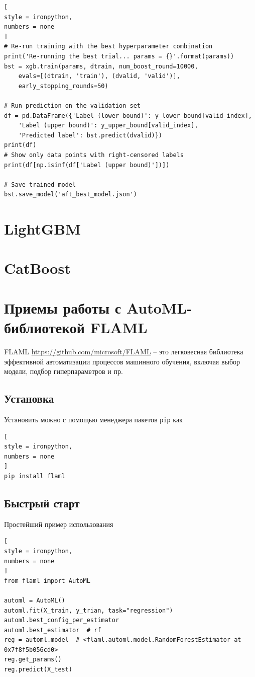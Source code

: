 \documentclass[%
	11pt,
	a4paper,
	utf8,
		]{article}
\begin{document}
\begin{lstlisting}[
style = ironpython,
numbers = none
]
# Re-run training with the best hyperparameter combination
print('Re-running the best trial... params = {}'.format(params))
bst = xgb.train(params, dtrain, num_boost_round=10000,
	evals=[(dtrain, 'train'), (dvalid, 'valid')],
	early_stopping_rounds=50)

# Run prediction on the validation set
df = pd.DataFrame({'Label (lower bound)': y_lower_bound[valid_index],
	'Label (upper bound)': y_upper_bound[valid_index],
	'Predicted label': bst.predict(dvalid)})
print(df)
# Show only data points with right-censored labels
print(df[np.isinf(df['Label (upper bound)'])])

# Save trained model
bst.save_model('aft_best_model.json')
\end{lstlisting}



\section{LightGBM}

\section{CatBoost}

\section{Приемы работы с AutoML-библиотекой FLAML}

FLAML \url{https://github.com/microsoft/FLAML} -- это легковесная библиотека эффективной автоматизации процессов машинного обучения, включая выбор модели, подбор гиперпараметров и пр.

\subsection{Установка}

Установить можно с помощью менеджера пакетов \verb|pip| как
\begin{lstlisting}[
style = ironpython,
numbers = none
]
pip install flaml
\end{lstlisting}

\subsection{Быстрый старт}

Простейший пример использования
\begin{lstlisting}[
style = ironpython,
numbers = none
]
from flaml import AutoML

automl = AutoML()
automl.fit(X_train, y_trian, task="regression")
automl.best_config_per_estimator
automl.best_estimator  # rf
reg = automl.model  # <flaml.automl.model.RandomForestEstimator at 0x7f8f5b056cd0>
reg.get_params()
reg.predict(X_test)
\end{lstlisting}
\end{document}
